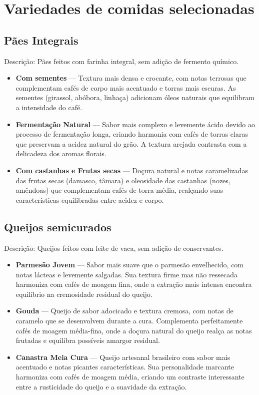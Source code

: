 \documentclass[a4paper,12pt]{article}
\begin{document}
\section{Variedades de comidas selecionadas}

\subsection{Pães Integrais}
Descrição: Pães feitos com farinha integral, sem adição de fermento químico.
\begin{itemize}
  \item \textbf{Com sementes} — Textura mais densa e crocante, com notas terrosas que complementam cafés de corpo mais acentuado e torras mais escuras. As sementes (girassol, abóbora, linhaça) adicionam óleos naturais que equilibram a intensidade do café.
  \item \textbf{Fermentação Natural} — Sabor mais complexo e levemente ácido devido ao processo de fermentação longa, criando harmonia com cafés de torras claras que preservam a acidez natural do grão. A textura arejada contrasta com a delicadeza dos aromas florais.
  \item \textbf{Com castanhas e Frutas secas} — Doçura natural e notas caramelizadas das frutas secas (damasco, tâmara) e oleosidade das castanhas (nozes, amêndoas) que complementam cafés de torra média, realçando suas características equilibradas entre acidez e corpo.
\end{itemize}

\subsection{Queijos semicurados}
Descrição: Queijos feitos com leite de vaca, sem adição de conservantes.
\begin{itemize}
  \item \textbf{Parmesão Jovem} — Sabor mais suave que o parmesão envelhecido, com notas lácteas e levemente salgadas. Sua textura firme mas não ressecada harmoniza com cafés de moagem fina, onde a extração mais intensa encontra equilíbrio na cremosidade residual do queijo.
  \item \textbf{Gouda} — Queijo de sabor adocicado e textura cremosa, com notas de caramelo que se desenvolvem durante a cura. Complementa perfeitamente cafés de moagem média-fina, onde a doçura natural do queijo realça as notas frutadas e equilibra possíveis amargor residual.
  \item \textbf{Canastra Meia Cura} — Queijo artesanal brasileiro com sabor mais acentuado e notas picantes características. Sua personalidade marcante harmoniza com cafés de moagem média, criando um contraste interessante entre a rusticidade do queijo e a suavidade da extração.
\end{itemize}
\end{document}
